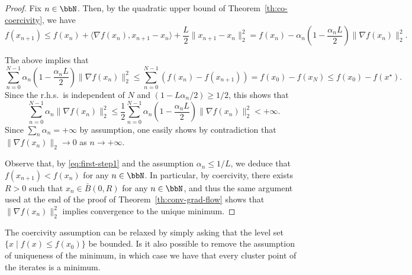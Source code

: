      \begin{proof}
         Fix $n\in\bbN$.
         Then, by the quadratic upper bound of Theorem~\ref{th:co-coercivity}, we have
         \begin{equation}
             \label{eq:first-step1}
             f(x_{n+1})
             \le f(x_n) + \langle \nabla f(x_n), x_{n+1}-x_n \rangle+\frac{L}2\|x_{n+1}-x_n\|_2^2
             = f(x_n)-\alpha_n \left(1-\frac{\alpha_n L}2\right) \|\nabla f(x_n)\|_2^2.
         \end{equation}
 
         The above implies that
         \begin{equation}
             \sum_{n=0}^{N-1} \alpha_n \left(1-\frac{\alpha_n L}2\right) \|\nabla f(x_n)\|_2^2 \le \sum_{n=0}^{N-1} \left(f(x_{n})-f(x_{n+1})\right) =f(x_0) - f(x_N) \le f(x_0)-f(x^\star).
         \end{equation}
         Since the r.h.s.~is independent of $N$ and $(1-L\alpha_n/2) \ge 1/2$, this shows that
         \begin{equation}
             \sum_{n=0}^{N-1} \alpha_n  \|\nabla f(x_n)\|_2^2 \le
             \frac12\sum_{n=0}^{N-1} \alpha_n \left(1-\frac{\alpha_n L}2\right) \|\nabla f(x_n)\|_2^2 < +\infty.
         \end{equation}
         Since $\sum_n \alpha_n = +\infty$ by assumption, one easily shows by contradiction that $\|\nabla f(x_n)\|_2\rightarrow 0$ as $n\to +\infty$.
 
         Observe that, by \eqref{eq:first-step1} and the assumption $\alpha_n\le 1/L$, we deduce that $f(x_{n+1})<f(x_n)$ for any $n\in \bbN$. In particular, by coercivity, there exists $R>0$ such that $x_n\in \bar B(0,R)$ for any $n\in \bbN$, and thus the same argument used at the end of the proof of Theorem~\ref{th:conv-grad-flow} shows that $\|\nabla f(x_n)\|_2^2$ implies convergence to the unique minimum.
     \end{proof}
 
     \begin{remark}
         The coercivity assumption can be relaxed by simply asking that the level set $\{x\mid f(x)\le f(x_0)\}$ be bounded.
         Is it also possible to remove the assumption of uniqueness of the minimum, in which case we have that every cluster point of the iterates is a minimum.
     \end{remark}
 
